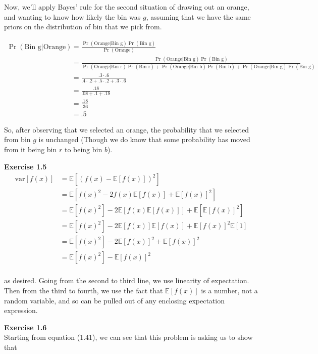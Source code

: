 \documentclass{article}
\newcommand{\E}{\mathbb{E}}
\newcommand{\var}{\text{var}}
\begin{document}
Now, we'll apply Bayes' rule for the second situation of drawing out an orange, and wanting to know how likely the bin was $g$, assuming that we have the same priors on the distribution of bin that we pick from.

\begin{align*}
\Pr(\text{Bin g} | \text{Orange}) &= \frac{\Pr(\text{Orange} | \text{Bin g}) \Pr(\text{Bin g})}{\Pr(\text{Orange})}\\
&=\frac{\Pr(\text{Orange} | \text{Bin g}) \Pr(\text{Bin g})}{\Pr(\text{Orange}|\text{Bin r})\Pr(\text{Bin r}) +  \Pr(\text{Orange}|\text{Bin b})\Pr(\text{Bin b})+ \Pr(\text{Orange}|\text{Bin g})\Pr(\text{Bin g})}\\
&=\frac{.3 \cdot .6}{.4 \cdot .2 + .5 \cdot .2 + .3 \cdot .6}\\
&=\frac{.18}{.08 + .1 + .18}\\
&=\frac{.18}{.36}\\
&=.5
\end{align*}

So, after observing that we selected an orange, the probability that we selected from bin $g$ is unchanged (Though we do know that some probability has moved from it being bin $r$ to being bin $b$).


\noindent\textbf{Exercise 1.5}\\

\begin{align*}
\var[f(x)] &= \E\left[ (f(x) - \E[f(x)])^2\right]\\
&= \E\left[ f(x)^2 - 2f(x)\E[f(x)] + \E[f(x)]^2\right]\\
&= \E\left[ f(x)^2 \right] - 2\E\left[f(x)\E[f(x)]\right] + \E\left[\E[f(x)]^2\right]\\
&= \E\left[ f(x)^2 \right] - 2 \E[f(x)] \E[f(x)] + \E[f(x)]^2\E\left[1\right]\\
&= \E\left[ f(x)^2 \right] - 2  \E[f(x)]^2 + \E[f(x)]^2\\
&= \E\left[ f(x)^2 \right] -   \E[f(x)]^2 \\
\end{align*}

as desired. Going from the second to third line, we use linearity of expectation. Then from the third to fourth, we use the fact that $\E[f(x)]$ is a number, not a random variable, and so can be pulled out of any enclosing expectation expression.

\noindent\textbf{Exercise 1.6}\\

Starting from equation (1.41), we can see that this problem is asking us to show that
\end{document}
